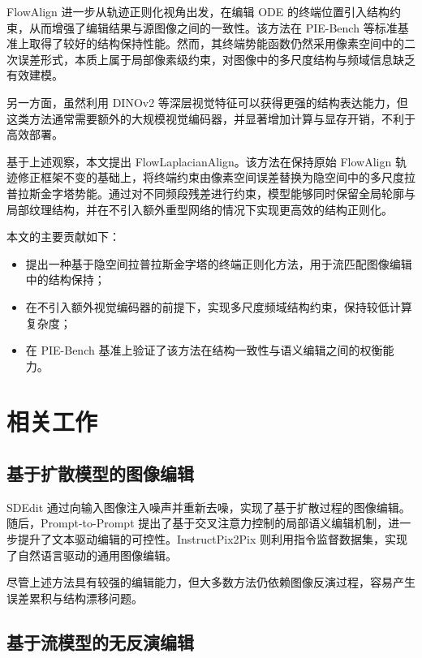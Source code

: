 \documentclass[11pt,a4paper]{ctexart}
\numberwithin{equation}{section}
\begin{document}
FlowAlign 进一步从轨迹正则化视角出发，在编辑 ODE 的终端位置引入结构约束，从而增强了编辑结果与源图像之间的一致性。该方法在 PIE-Bench 等标准基准上取得了较好的结构保持性能。然而，其终端势能函数仍然采用像素空间中的二次误差形式，本质上属于局部像素级约束，对图像中的多尺度结构与频域信息缺乏有效建模。

另一方面，虽然利用 DINOv2 等深层视觉特征可以获得更强的结构表达能力，但这类方法通常需要额外的大规模视觉编码器，并显著增加计算与显存开销，不利于高效部署。

基于上述观察，本文提出 FlowLaplacianAlign。该方法在保持原始 FlowAlign 轨迹修正框架不变的基础上，将终端约束由像素空间误差替换为隐空间中的多尺度拉普拉斯金字塔势能。通过对不同频段残差进行约束，模型能够同时保留全局轮廓与局部纹理结构，并在不引入额外重型网络的情况下实现更高效的结构正则化。

本文的主要贡献如下：

\begin{itemize}
    \item 提出一种基于隐空间拉普拉斯金字塔的终端正则化方法，用于流匹配图像编辑中的结构保持；
    
    \item 在不引入额外视觉编码器的前提下，实现多尺度频域结构约束，保持较低计算复杂度；
    
    \item 在 PIE-Bench 基准上验证了该方法在结构一致性与语义编辑之间的权衡能力。
\end{itemize}

\section{相关工作}

\subsection{基于扩散模型的图像编辑}

SDEdit 通过向输入图像注入噪声并重新去噪，实现了基于扩散过程的图像编辑。随后，Prompt-to-Prompt 提出了基于交叉注意力控制的局部语义编辑机制，进一步提升了文本驱动编辑的可控性。InstructPix2Pix 则利用指令监督数据集，实现了自然语言驱动的通用图像编辑。

尽管上述方法具有较强的编辑能力，但大多数方法仍依赖图像反演过程，容易产生误差累积与结构漂移问题。

\subsection{基于流模型的无反演编辑}
\end{document}
